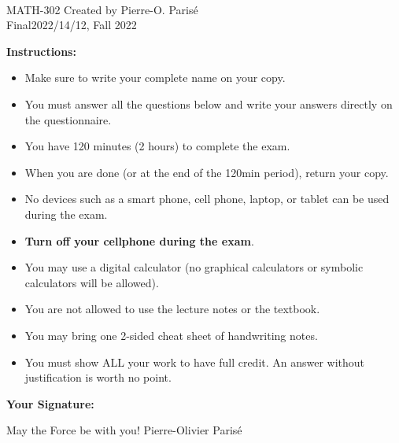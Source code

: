 \documentclass[addpoints, 12pt]{exam}%
\theoremstyle{definition}
\begin{document}
	\noindent \hrulefill \\
	\noindent MATH-302 \hfill Created by Pierre-O. Paris{\'e}\\
	Final\hfill 2022/14/12, Fall 2022\\\vspace*{-0.7cm}

\noindent\hrulefill
	
\vspace*{1cm}

\noindent{}

\vspace*{1cm}

\vspace*{1cm}

\noindent\textbf{Instructions:} 

\begin{itemize}
\item Make sure to write your complete name on your copy. 
\item You must answer all the questions below and write your answers directly on the questionnaire.
\item You have 120 minutes (2 hours) to complete the exam.
\item When you are done (or at the end of the 120min period), return your copy. 
\item No devices such as a smart phone, cell phone, laptop, or tablet can be used during the exam. 
\item \textbf{Turn off your cellphone during the exam}.
\item You may use a digital calculator (no graphical calculators or symbolic calculators will be allowed).
\item You are not allowed to use the lecture notes or the textbook.
\item You may bring one 2-sided cheat sheet of handwriting notes. 
\item You must show ALL your work to have full credit. An answer without justification is worth no point.
\end{itemize}

\vspace{0.5cm}

\noindent\textbf{Your Signature:} \hrulefill

\vspace*{2cm}
\noindent May the Force be with you! \hfill Pierre-Olivier Parisé
\end{document}

